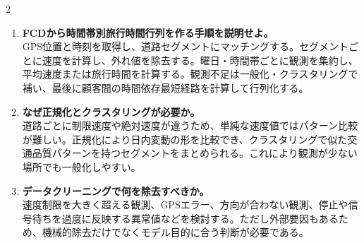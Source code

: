 \begin{multicols}{2}
\begin{enumerate}
\item \textbf{FCDから時間帯別旅行時間行列を作る手順を説明せよ。}\\
GPS位置と時刻を取得し、道路セグメントにマッチングする。セグメントごとに速度を計算し、外れ値を除去する。曜日・時間帯ごとに観測を集約し、平均速度または旅行時間を計算する。観測不足は一般化・クラスタリングで補い、最後に顧客間の時間依存最短経路を計算して行列化する。
\item \textbf{なぜ正規化とクラスタリングが必要か。}\\
道路ごとに制限速度や絶対速度が違うため、単純な速度値ではパターン比較が難しい。正規化により日内変動の形を比較でき、クラスタリングで似た交通品質パターンを持つセグメントをまとめられる。これにより観測が少ない場所でも一般化しやすい。
\item \textbf{データクリーニングで何を除去すべきか。}\\
速度制限を大きく超える観測、GPSエラー、方向が合わない観測、停止や信号待ちを過度に反映する異常値などを検討する。ただし外部要因もあるため、機械的除去だけでなくモデル目的に合う判断が必要である。
\end{enumerate}

\end{multicols}

\clearpage



\vspace{1.5mm}

